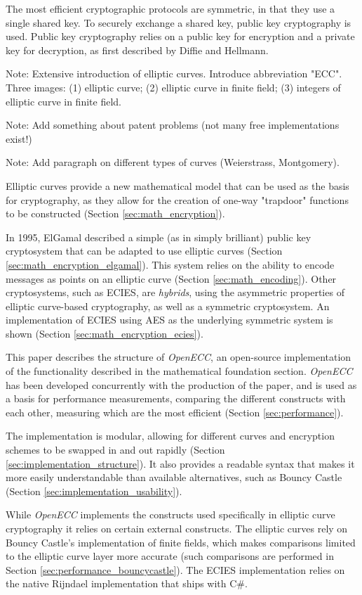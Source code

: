 The most efficient cryptographic protocols are symmetric, in that they use a single shared key.
To securely exchange a shared key, public key cryptography is used. Public key cryptography
relies on a public key for encryption and a private key for decryption, as first described by
Diffie and Hellmann.

Note: Extensive introduction of elliptic curves. Introduce abbreviation "ECC". Three images:
(1) elliptic curve; (2) elliptic curve in finite field; (3) integers of elliptic curve in finite
field.

Note: Add something about patent problems (not many free implementations exist!)

Note: Add paragraph on different types of curves (Weierstrass, Montgomery).

Elliptic curves provide a new mathematical model that can be used as the basis for cryptography,
as they allow for the creation of one-way "trapdoor" functions to be constructed (Section
\ref{sec:math_encryption}).

In 1995, ElGamal described a simple (as in simply brilliant) public key cryptosystem that can be adapted
to use elliptic curves (Section \ref{sec:math_encryption_elgamal}). This system relies on the ability to
encode messages as points on an elliptic curve (Section \ref{sec:math_encoding}). Other cryptosystems,
such as ECIES, are \emph{hybrids}, using the asymmetric properties of elliptic curve-based cryptography,
as well as a symmetric cryptosystem. An implementation of ECIES using AES as the underlying symmetric
system is shown (Section \ref{sec:math_encryption_ecies}).

This paper describes the structure of \emph{OpenECC}, an open-source implementation of the functionality
described in the mathematical foundation section. \emph{OpenECC} has been developed concurrently with the
production of the paper, and is used as a basis for performance measurements, comparing the different constructs
with each other, measuring which are the most efficient (Section \ref{sec:performance}).

The implementation is modular, allowing for different curves and encryption schemes to be swapped in and out
rapidly (Section \ref{sec:implementation_structure}). It also provides a readable syntax that makes it more easily
understandable than available alternatives, such as Bouncy Castle (Section \ref{sec:implementation_usability}).

While \emph{OpenECC} implements the constructs used specifically in elliptic curve cryptography it relies on certain
external constructs. The elliptic curves rely on Bouncy Castle's implementation of finite fields, which makes comparisons
limited to the elliptic curve layer more accurate (such comparisons are performed in Section \ref{sec:performance_bouncycastle}).
The ECIES implementation relies on the native Rijndael implementation that ships with C\#.

